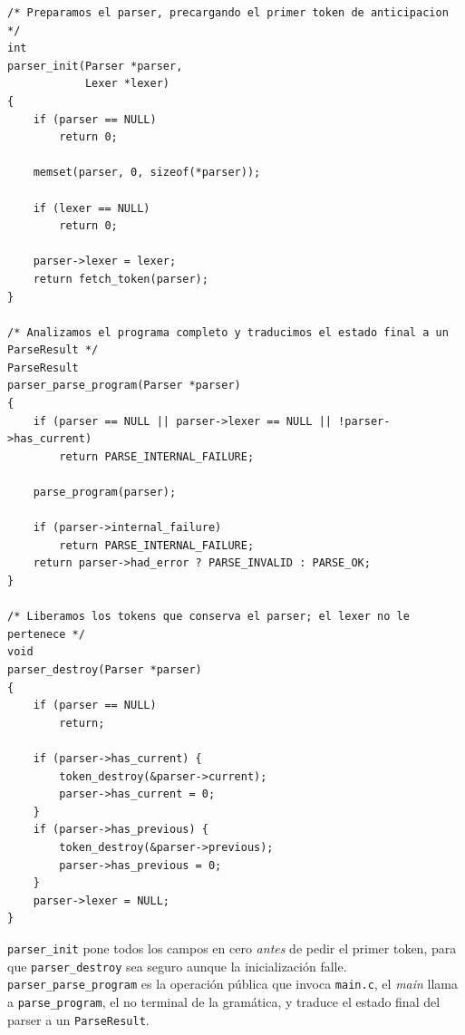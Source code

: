 \documentclass[12pt,letterpaper]{article}
\begin{document}
\begin{lstlisting}[style=modernc, caption={Funciones públicas \texttt{parser\_init}, \texttt{parser\_parse\_program} y \texttt{parser\_destroy}.}]
/* Preparamos el parser, precargando el primer token de anticipacion */
int
parser_init(Parser *parser,
            Lexer *lexer)
{
    if (parser == NULL)
        return 0;

    memset(parser, 0, sizeof(*parser));

    if (lexer == NULL)
        return 0;

    parser->lexer = lexer;
    return fetch_token(parser);
}

/* Analizamos el programa completo y traducimos el estado final a un ParseResult */
ParseResult
parser_parse_program(Parser *parser)
{
    if (parser == NULL || parser->lexer == NULL || !parser->has_current)
        return PARSE_INTERNAL_FAILURE;

    parse_program(parser);

    if (parser->internal_failure)
        return PARSE_INTERNAL_FAILURE;
    return parser->had_error ? PARSE_INVALID : PARSE_OK;
}

/* Liberamos los tokens que conserva el parser; el lexer no le pertenece */
void
parser_destroy(Parser *parser)
{
    if (parser == NULL)
        return;

    if (parser->has_current) {
        token_destroy(&parser->current);
        parser->has_current = 0;
    }
    if (parser->has_previous) {
        token_destroy(&parser->previous);
        parser->has_previous = 0;
    }
    parser->lexer = NULL;
}
\end{lstlisting}

\bigskip

\texttt{parser\_init} pone todos los campos en cero \emph{antes} de pedir el primer token, para que
\texttt{parser\_destroy} sea seguro aunque la inicialización falle. \texttt{parser\_parse\_program} es la
operación pública que invoca \texttt{main.c}, el \emph{main} llama a \texttt{parse\_program}, el no terminal
de la gramática, y traduce el estado final del parser a un \texttt{ParseResult}.
\end{document}
